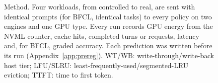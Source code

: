 \begin{figure}[t]
\caption{Method. Four workloads, from controlled to real, are sent with identical prompts (for BFCL, identical tasks) to every policy on two
engines and one GPU type\@. Every run records GPU energy from the NVML counter, cache hits, completed turns or requests,
latency and, for BFCL, graded accuracy. Each prediction was written before its run (Appendix~\ref{app:prereg}). WT/WB: write-through/write-back host tier; LFU/SLRU: least-frequently-used/segmented-LRU eviction; TTFT: time to first token.}
\label{fig:workflow}
\end{figure}
